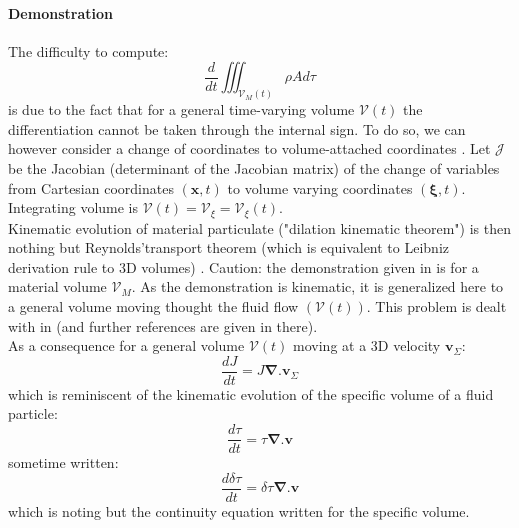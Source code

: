 \paragraph{Demonstration}
The difficulty to compute:
\begin{equation}
 \displaystyle
 \frac{d}{dt} \iiint_{\mathcal{V}_M(t)} \rho A d\tau
\end{equation}
is due to the fact that for a general time-varying volume $\mathcal{V}(t)$ the differentiation cannot be taken through the internal sign. To do so, we can however consider a change of coordinates to volume-attached coordinates \citep{hirasaki_chapter_2021}. Let $\mathcal{J}$ be the Jacobian (determinant of the Jacobian matrix) of the change of variables from Cartesian coordinates $(\mathbf{x},t)$ to volume varying coordinates $(\boldsymbol{\xi},t)$. Integrating volume is $\mathcal{V}(t)=\mathcal{V}_{\xi}=\mathcal{V}_{\xi}(t)$.\\
Kinematic evolution of material particulate ("dilation kinematic theorem") is then nothing but Reynolds'transport theorem (which is equivalent to Leibniz derivation rule to 3D volumes) \citep{hirasaki_chapter_2021}. Caution: the demonstration given in \citep{hirasaki_chapter_2021} is for a material volume $\mathcal{V}_M$. As the demonstration is kinematic, it is generalized here to a general volume moving thought the fluid flow $(\mathcal{V}(t))$. This problem is dealt with in \cite{web_course_web_2021} (and further references are given in there).\\
As a consequence for a general volume $\mathcal{V}(t)$ moving at a 3D velocity $  \mathbf{v}_{\Sigma}$:
\begin{equation}
 \displaystyle
 \frac{dJ}{dt}=J \mathbf{\nabla}.\mathbf{v}_{\Sigma}
\end{equation}
which is reminiscent of the kinematic evolution of the specific volume of a fluid particle:
\begin{equation}
 \displaystyle
 \frac{d\tau}{dt}=\tau \mathbf{\nabla}.\mathbf{v}
\end{equation}
sometime written:
\begin{equation}
 \displaystyle
 \frac{d\delta\tau}{dt}=\delta\tau \mathbf{\nabla}.\mathbf{v}
\end{equation}
which is noting but the continuity equation written for the specific volume.

